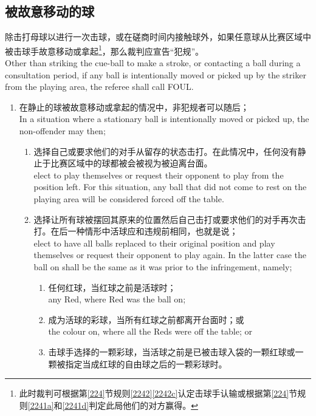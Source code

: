 \subsection{被故意移动的球}\label{22316}

\noindent 除击打母球以进行一次击球，或在磋商时间内接触球外，如果任意球从比赛区域中被击球手故意移动或拿起\footnote{此时裁判可根据第\ref{224}节规则\ref{2242}\ref{2242c}认定击球手认输或根据第\ref{224}节规则\ref{2241a}和\ref{2241d}判定此局他们的对方赢得。}，那么裁判应宣告``犯规''。\\
Other than striking the cue-ball to make a stroke, or contacting a ball during a consultation period, if any ball is intentionally moved or picked up by the striker from the playing area, the referee shall call FOUL.
\begin{enumerate}[label=(\alph*)]
    \item \label{22316a}在静止的球被故意移动或拿起的情况中，非犯规者可以随后；\\
    In a situation where a stationary ball is intentionally 
    moved or picked up, the non-offender may then;
    \begin{enumerate}[label=(\roman*)]
        \item 选择自己或要求他们的对手从留存的状态击打。在此情况中，任何没有静止于比赛区域中的球都被会被视为被迫离台面。\\
        elect to play themselves or request their opponent to play from the position left. For this situation, any ball that did not come to rest on the playing area will be considered forced off the table.
        \item 选择让所有球被摆回其原来的位置然后自己击打或要求他们的对手再次击打。在后一种情形中活球应和违规前相同，也就是说；\\
        elect to have all balls replaced to their original position and play themselves or request their opponent to play again. In the latter case the ball on shall be the same as it was prior to the infringement, namely;
        \begin{enumerate}[label=(\roman*)]
            \item 任何红球，当红球之前是活球时；\\
            any Red, where Red was the ball on;
            \item 成为活球的彩球，当所有红球之前都离开台面时；或\\
            the colour on, where all the Reds were off the table; or
            \item 击球手选择的一颗彩球，当活球之前是已被击球入袋的一颗红球或一颗被指定当成红球的自由球之后的一颗彩球时。\\

\end{enumerate}
\end{enumerate}
\end{enumerate}
